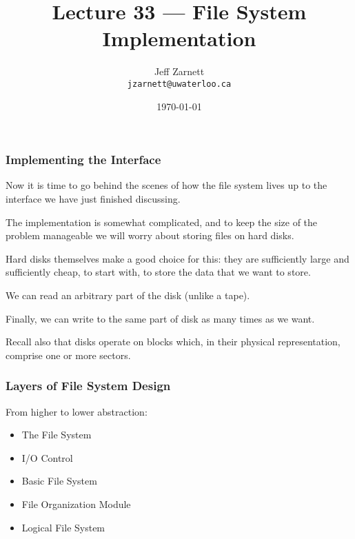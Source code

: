 

\title{Lecture 33 --- File System Implementation}

\author{Jeff Zarnett \\ \small \texttt{jzarnett@uwaterloo.ca}}
\date{\today}




\begin{frame}
  \titlepage

 \end{frame}



\begin{frame}
\frametitle{Implementing the Interface}

Now it is time to go behind the scenes of how the file system lives up to the interface we have just finished discussing. 

The implementation is somewhat complicated, and to keep the size of the problem manageable we will worry about storing files on hard disks.

 Hard disks themselves make a good choice for this: they are sufficiently large and sufficiently cheap, to start with, to store the data that we want to store. 
 
 We can read an arbitrary part of the disk (unlike a tape). 
 
Finally, we can write to the same part of disk as many times as we want. 
 
Recall also that disks operate on blocks which, in their physical representation, comprise one or more sectors.


\end{frame}

\begin{frame}
\frametitle{Layers of File System Design}

From higher to lower abstraction:

\begin{itemize}
	\item The File System
	\item I/O Control
	\item Basic File System
	\item File Organization Module
	\item Logical File System
\end{itemize}

\end{frame}

